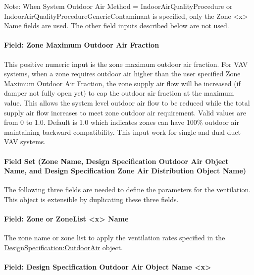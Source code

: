 Note: When System Outdoor Air Method = IndoorAirQualityProcedure or IndoorAirQualityProcedureGenericContaminant is specified, only the Zone \textless{}x\textgreater{} Name fields are used. The other field inputs described below are not used.

\paragraph{Field: Zone Maximum Outdoor Air Fraction}\label{field-zone-maximum-outdoor-air-fraction}

This positive numeric input is the zone maximum outdoor air fraction. For VAV systems, when a zone requires outdoor air higher than the user specified Zone Maximum Outdoor Air Fraction, the zone supply air flow will be increased (if damper not fully open yet) to cap the outdoor air fraction at the maximum value. This allows the system level outdoor air flow to be reduced while the total supply air flow increases to meet zone outdoor air requirement. Valid values are from 0 to 1.0. Default is 1.0 which indicates zones can have 100\% outdoor air maintaining backward compatibility. This input work for single and dual duct VAV systems.

\paragraph{Field Set (Zone Name, Design Specification Outdoor Air Object Name, and Design Specification Zone Air Distribution Object Name)}\label{field-set-zone-name-design-specification-outdoor-air-object-name-and-design-specification-zone-air-distribution-object-name}

The following three fields are needed to define the parameters for the ventilation. This object is extensible by duplicating these three fields.

\paragraph{Field: Zone or ZoneList \textless{}x\textgreater{} Name}\label{fieldzoneorzonelist-x-name}

The zone name or zone list to apply the ventilation rates specified in the \hyperref[designspecificationoutdoorair]{DesignSpecification:OutdoorAir} object.

\paragraph{Field: Design Specification Outdoor Air Object Name \textless{}x\textgreater{}}\label{field-design-specification-outdoor-air-object-name-x}

